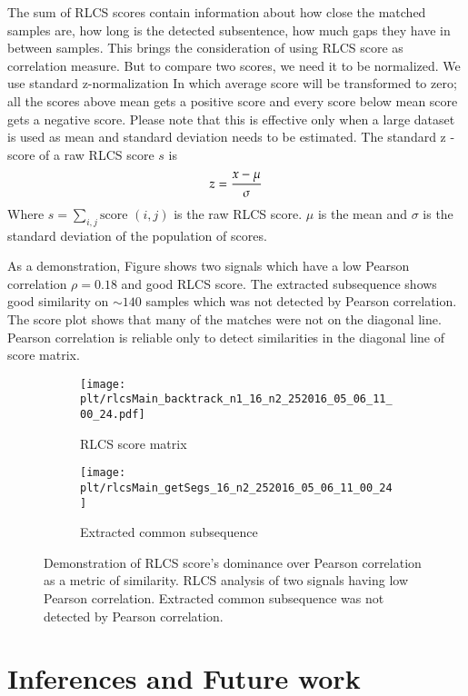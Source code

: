 \documentclass[MTech]{iitmdiss}
\newcommand{\plt}{thesis_plots}
\begin{document}
The sum of RLCS scores contain information about how close the matched samples are, how long is the detected subsentence, how much gaps they have in between samples. This brings the consideration of using RLCS score as correlation measure. But to compare two scores, we need it to be normalized. We use standard z-normalization In which average score will be transformed to zero; all the scores above mean gets a positive score and every score below mean score gets a negative score. Please note that this is effective only when a large dataset is used as mean and standard deviation needs to be estimated. The standard z - score of a raw RLCS score $s$ is
$$z = {x- \mu \over \sigma}$$
Where $s = \sum_{i, j} \text{score } (i, j)$ is the raw RLCS score.
$\mu$ is the mean and $\sigma$ is the standard deviation of the population of scores.

As a demonstration, Figure shows two signals which have a low Pearson correlation $\rho= 0.18$ and good RLCS score. The extracted subsequence shows good similarity on $\sim 140$ samples which was not detected by Pearson correlation. The score plot shows that many of the matches were not on the diagonal line. Pearson correlation is reliable only to detect similarities in the diagonal line of score matrix.
\begin{figure}[h]
  \begin{subfigure}[b]{0.5\textwidth}
    \texttt{[image: \\plt/rlcsMain\_backtrack\_n1\_16\_n2\_252016\_05\_06\_11\_00\_24.pdf]}
    \caption{RLCS score matrix}
    \label{fig:ori_simple}
  \end{subfigure}%
  \begin{subfigure}[b]{0.5\textwidth}
    \texttt{[image: \\plt/rlcsMain\_getSegs\_16\_n2\_252016\_05\_06\_11\_00\_24]}
    \caption{Extracted common subsequence}
    \label{fig:acfgram_diff}
  \end{subfigure}%
  \caption{Demonstration of RLCS score's dominance over Pearson correlation as a metric of similarity. RLCS analysis of two signals having low Pearson correlation. Extracted common subsequence was not detected by Pearson correlation.}
  \label{fig:oridir_simple}
\end{figure}

\chapter{Inferences and Future work}    %
\label{chap:summary}
\end{document}

